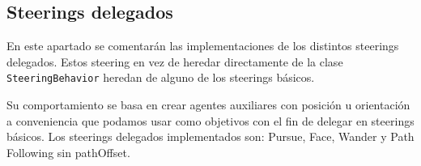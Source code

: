 \subsection{Steerings delegados}

En este apartado se comentarán las implementaciones de los distintos steerings delegados. Estos steering en vez de heredar directamente de la clase \texttt{SteeringBehavior} heredan de alguno de los steerings básicos.

Su comportamiento se basa en crear agentes auxiliares con posición u orientación a conveniencia que podamos usar como objetivos con el fin de delegar en steerings básicos. Los steerings delegados implementados son: Pursue, Face, Wander y Path Following sin pathOffset.








